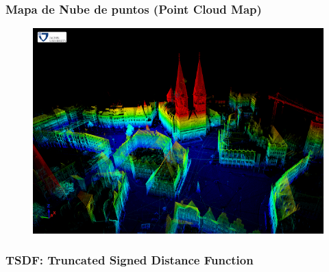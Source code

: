 \begin{frame}
    \frametitle{Mapa de Nube de puntos (Point Cloud Map)}
    
    
   	\begin{figure}
    	\includegraphics[width=0.6\columnwidth]{./images/point_cloud_map_bremen_city.png}
    \end{figure}
    
\end{frame}

\begin{frame}
    \frametitle{TSDF: Truncated Signed Distance Function}
   
   	\begin{figure}[!h]
	   	\centering
   \end{figure}
    
\end{frame}


